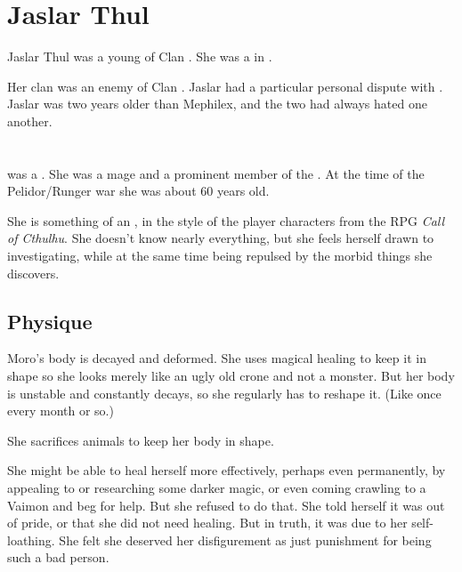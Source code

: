 \section{Jaslar Thul}
Jaslar Thul was a young \sphyle of Clan . 
She was a \rethyax in \Yormis. 

Her clan was an enemy of Clan . 
Jaslar had a particular personal dispute with . 
Jaslar was two years older than Mephilex, and the two had always hated one another. 















\section{\MoroCobrel}
\MoroCobrel{} was a \sphyle{}. 
She was a \rethyactic mage and a prominent member of the \Malcuric{} \ishrah. 
At the time of the Pelidor/Runger war she was about 60 years old. 

She is something of an , in the style of the player characters from the RPG \emph{Call of Cthulhu}. She doesn't know nearly everything, but she feels herself drawn to investigating, while at the same time being repulsed by the morbid things she discovers. 









\subsection{Physique}
Moro's body is decayed and deformed. 
She uses magical healing to keep it in shape so she looks merely like an ugly old crone and not a monster. 
But her body is unstable and constantly decays, so she regularly has to reshape it. 
(Like once every month or so.)

She sacrifices animals to keep her body in shape. 

She might be able to heal herself more effectively, perhaps even permanently, by appealing to  or researching some darker magic, or even coming crawling to a Vaimon and beg for help. 
But she refused to do that. 
She told herself it was out of pride, or that she did not need healing. 
But in truth, it was due to her self-loathing. 
She felt she deserved her disfigurement as just punishment for being such a bad person. 

